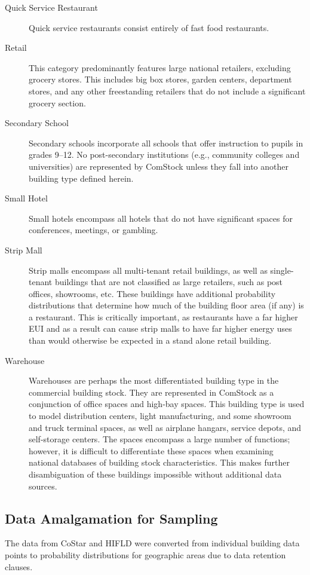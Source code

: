 \begin{description}
\item[Quick Service Restaurant] Quick service restaurants consist entirely of fast food restaurants.
\item[Retail] This category predominantly features large national retailers, excluding grocery stores. This includes big box stores, garden centers, department stores, and any other freestanding retailers that do not include a significant grocery section.
\item[Secondary School] Secondary schools incorporate all schools that offer instruction to pupils in grades 9--12. No post-secondary institutions (e.g., community colleges and universities) are represented by ComStock unless they fall into another building type defined herein.
\item[Small Hotel] Small hotels encompass all hotels that do not have significant spaces for conferences, meetings, or gambling.
\item[Strip Mall] Strip malls encompass all multi-tenant retail buildings, as well as single-tenant buildings that are not classified as large retailers, such as post offices, showrooms, etc. These buildings have additional probability distributions that determine how much of the building floor area (if any) is a restaurant. This is critically important, as restaurants have a far higher EUI and as a result can cause strip malls to have far higher energy uses than would otherwise be expected in a stand alone retail building.
\item[Warehouse] Warehouses are perhaps the most differentiated building type in the commercial building stock. They are represented in ComStock as a conjunction of office spaces and high-bay spaces. This building type is used to model distribution centers, light manufacturing, and some showroom and truck terminal spaces, as well as airplane hangars, service depots, and self-storage centers. The spaces encompass a large number of functions; however, it is difficult to differentiate these spaces when examining national databases of building stock characteristics. This makes further disambiguation of these buildings impossible without additional data sources.
\end{description}

\subsection{Data Amalgamation for Sampling} \label{sec:3.1.3data amalgamation for sampling}

The data from CoStar and HIFLD were converted from individual building data points to probability distributions for geographic areas due to data retention clauses.


